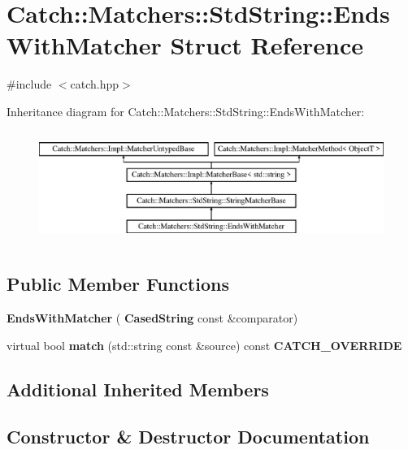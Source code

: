 \section{Catch\+:\+:Matchers\+:\+:Std\+String\+:\+:Ends\+With\+Matcher Struct Reference}
\label{struct_catch_1_1_matchers_1_1_std_string_1_1_ends_with_matcher}


{\ttfamily \#include $<$catch.\+hpp$>$}

Inheritance diagram for Catch\+:\+:Matchers\+:\+:Std\+String\+:\+:Ends\+With\+Matcher\+:\begin{figure}[H]
\begin{center}
\leavevmode
\includegraphics[height=3.696370cm]{struct_catch_1_1_matchers_1_1_std_string_1_1_ends_with_matcher}
\end{center}
\end{figure}
\subsection*{Public Member Functions}
\begin{DoxyCompactItemize}
\item 
\textbf{ Ends\+With\+Matcher} (\textbf{ Cased\+String} const \&comparator)
\item 
virtual bool \textbf{ match} (std\+::string const \&source) const \textbf{ C\+A\+T\+C\+H\+\_\+\+O\+V\+E\+R\+R\+I\+DE}
\end{DoxyCompactItemize}
\subsection*{Additional Inherited Members}


\subsection{Constructor \& Destructor Documentation}
\mbox{\label{struct_catch_1_1_matchers_1_1_std_string_1_1_ends_with_matcher_aa5ec700b4629562f74f362080accfd7b}} 
